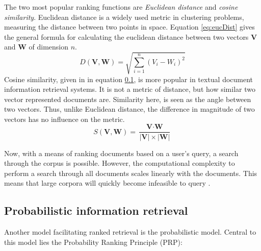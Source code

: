 \documentclass[twoside]{uva-inf-bachelor-thesis}
\begin{document}
The two most popular ranking functions are \textit{Euclidean distance} and \textit{cosine similarity}. Euclidean distance is a widely used metric in clustering problems, measuring the distance between two points in space. Equation \ref{eq:eucDist} gives the general formula for calculating the euclidean distance between two vectors $\textbf{V}$ and $\textbf{W}$ of dimension $n$. \cite{huang2008similarity}
\begin{equation}\label{eq:eucDist}
    D(\textbf{V}, \textbf{W}) = \sqrt{\sum_{i=1}^{n} (V_{i} - W_{i})^{2}}
\end{equation}
Cosine similarity, given in in equation \ref{}, is more popular in textual document information retrieval systems. It is not a metric of distance, but how similar two vector represented documents are. Similarity here, is seen as the angle between two vectors. Thus, unlike Euclidean distance, the difference in magnitude of two vectors has no influence on the metric. \cite{huang2008similarity, rahutomo2012semantic, manning08IR}
\begin{equation}\label{eq:cossim}
    S(\textbf{V}, \textbf{W}) = \frac{\textbf{V} \cdot \textbf{W}}{\lvert \textbf{V} \rvert \times \lvert \textbf{W} \rvert}
\end{equation}

Now, with a means of ranking documents based on a user's query, a search through the corpus is possible. However, the computational complexity to perform a search through all documents scales linearly with the documents. This means that large corpora will quickly become infeasible to query \cite{malkov2018efficient}.

\subsection{Probabilistic information retrieval}
Another model facilitating ranked retrieval is the probabilistic model. Central to this model lies the Probability Ranking Principle (PRP):

 \cite{robertson1977probability}
\end{document}
